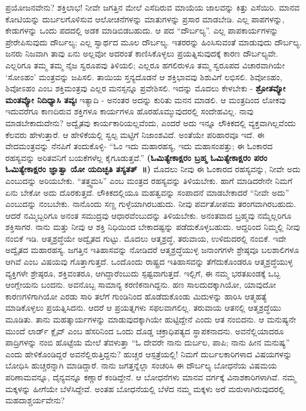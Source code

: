 ಪ್ರಯೋಜನವೇನು? ಶಕ್ತಿಲಾಭ! ನೀವೇ ಜಗತ್ತಿನ ಮೇಲೆ ಎಸೆದಿರುವ ಮಾಯೆಯ ಜಾಲವನ್ನು ಕಿತ್ತು ಎಸೆಯಿರಿ. ಮಾನವ ಕೋಟಿಯನ್ನು ದುರ್ಬಲಗೊಳಿಸುವ ಆಲೋಚನೆಗಳನ್ನು ಮಾತುಗಳನ್ನು ಪ್ರಸಾರ ಮಾಡಬೇಡಿ. ಎಲ್ಲ ಪಾಪಗಳನ್ನು, ಕೇಡುಗಳನ್ನು ಒಂದು ಪದದಲ್ಲಿ ಅಡಕ ಮಾಡಿಬಿಡಬಹುದು. ಆ ಪದ “ದೌರ್ಬಲ್ಯ”. ಎಲ್ಲ ಪಾಪಕಾರ್ಯಗಳನ್ನು ಪ್ರೇರೇಪಿಸುವುದು ದೌರ್ಬಲ್ಯ; ಎಲ್ಲ ಸ್ವಾರ್ಥದ ಮೂಲ ದೌರ್ಬಲ್ಯ. ಇತರರನ್ನು ಹಿಂಸಿಸುವಂತೆ ಮಾಡುವುದು ದೌರ್ಬಲ್ಯ. ಜನರು ನಿಜವಾಗಿ ತಾವು ಏನು ಅಲ್ಲವೋ ಅದರಂತೆ ಕಾಣಿಸಿಕೊಳ್ಳಲು ಪ್ರಯತ್ನಿಸುವುದಕ್ಕೆ ಕಾರಣ ದೌರ್ಬಲ್ಯವೇ. ಎಲ್ಲರಿಗೂ ತಮ್ಮ ತಮ್ಮ ನೈಜ ಸ್ವರೂಪವು ತಿಳಿಯಲಿ; ಎಲ್ಲರೂ ಹಗಲಿರುಳೂ ತಮ್ಮ ಸ್ವರೂಪದ ವಿಚಾರವಾಗಿಯೇ ‘ಸೋಽಹಂ’ ಮಂತ್ರವನ್ನು ಜಪಿಸಲಿ. ತಾಯಿಯ ಸ್ತನ್ಯದೊಡನೆ ಆ ಶಕ್ತಿಭಾವವು ಶಿಶುವಿಗೆ ಲಭಿಸಲಿ. ಶಿವೋಽಹಂ, ಶಿವೋಽಹಂ ಎಂಬ ಶಕ್ತಿಮಂತ್ರವು ಎಲ್ಲರ ಮನಸ್ಸನ್ನೂ ಪ್ರವೇಶಿಸಲಿ. ಇದನ್ನು ಮೊದಲು ಕೇಳಬೇಕು - \textbf{ಶ್ರೋತವ್ಯೋ ಮಂತವ್ಯೋ ನಿದಿಧ್ಯಾಸಿ ತವ್ಯಃ} ಇತ್ಯಾದಿ - ಅನಂತರ ಅದನ್ನು ಕುರಿತು ಮನನ ಮಾಡಲಿ. ಆ ಮಂತ್ರದಿಂದ ಲೋಕವು ಇದುವರೆಗೂ ಕಾಣದಿರುವ ಶಕ್ತಿಗಳೂ ಕಾರ್ಯಗಳೂ ಹೊರಹೊಮ್ಮುವುದರಲ್ಲಿ ಸಂದೇಹವಿಲ್ಲ. ನಾವು ಮಾಡಬೇಕಾದುದೇನು? ಅದ್ವೈತವು ಕಾರ್ಯಕಾರಿಯಲ್ಲವೆಂದು, ಎಂದರೆ ಅದು ಇನ್ನೂ ಲೌಕಿಕದಲ್ಲಿ ವ್ಯಕ್ತವಾಗಿಲ್ಲವೆಂದು ಕೆಲವರು ಹೇಳುತ್ತಾರೆ. ಆ ಹೇಳಿಕೆಯಲ್ಲಿ ಸ್ವಲ್ಪ ಮಟ್ಟಿಗೆ ನಿಜಾಂಶವಿದೆ. ಅಂತೆಯೇ ಪರಿಹಾರವೂ ಇದೆ. ಈ ವೇದಮಂತ್ರವನ್ನು ನೆನಪಿಗೆ ತಂದುಕೊಳ್ಳಿ- “ಓಂ ಇದು ಮಹಾರಹಸ್ಯ, ಇದು ಮಹಾಸಂಪತ್ತು; ಈ ಓಂಕಾರದ ರಹಸ್ಯವನ್ನು ಅರಿತವನಿಗೆ ಬಯಕೆಗಳೆಲ್ಲ ಕೈಗೂಡುತ್ತವೆ.” \textbf{(ಓಮಿತ್ಯೇಕಾಕ್ಷರಂ ಬ್ರಹ್ಮ ಓಮಿತ್ಯೇಕಾಕ್ಷರಂ ಪರಂ ಓಮಿತ್ಯೇಕಾಕ್ಷರಂ ಜ್ಞಾತ್ವಾ ಯೋ ಯದಿಚ್ಛತಿ ತಸ್ಯತತ್​~॥)} ಮೊದಲು ನೀವು ಈ ಓಂಕಾರದ ರಹಸ್ಯವನ್ನು, ನೀವೇ ಅದು ಎಂಬುದನ್ನು ಅರಿಯಬೇಕು. “ತತ್ತ್ವಮಸಿ” ಎಂಬ ಮಂತ್ರದ ರಹಸ್ಯವನ್ನು ತಿಳಿಯಬೇಕು. ಹಾಗೆ ಮಾಡಿದರೇನೇ ನಿಮಗೆ ಏನು ಬೇಕೋ ಅದು ದೊರಕುತ್ತದೆ. ಲೌಕಿಕದಲ್ಲಿಯೂ ಮಹತ್ವವನ್ನು ಸಂಪಾದನೆ ಮಾಡಬೇಕಾದರೆ “ನೀವೇ ಅದು” ಎಂಬುದನ್ನು ನಂಬಬೇಕು. ನಾನೊಂದು ಸಣ್ಣ ಗುಳ್ಳೆಯಾಗಿರಬಹುದು. ನೀವು ಪರ್ವತೋಪಮ ತರಂಗವಾಗಿರಬಹುದು. ಆದರೆ ನಮ್ಮಿಬ್ಬರಿಗೂ ಅನಂತ ಸಮುದ್ರವು ಆಧಾರವೆಂಬುದನ್ನು ತಿಳಿಯಬೇಕು. ಅನಂತವಾದ ಬ್ರಹ್ಮವು ನಮ್ಮೆಲ್ಲರಿಗೂ ಶಕ್ತಿಸಾಗರ. ನಾನು ಮತ್ತು ನೀವು ಆ ಶಕ್ತಿ ನಿಧಿಯಿಂದ ಬೇಕಾದಷ್ಟನ್ನು ಪಡೆದುಕೊಳ್ಳಬಹುದು. ಆದ್ದರಿಂದ ನಿಮ್ಮಲ್ಲಿ ನೀವು ನಂಬಿಕೆ ಇಡಿ. ಆತ್ಮಶ್ರದ್ಧೆಯೇ ಅದ್ವೈತದ ಗುಟ್ಟು. ಮೊದಲು ಆತ್ಮಶ್ರದ್ಧೆ, ತರುವಾಯ, ಉಳಿದುದರಲ್ಲಿ ನಂಬಿಕೆ. ಇದೇ ಅದ್ವೈತದ ಮಹಾರಹಸ್ಯ. ಜಗತ್ತಿನ ಇತಿಹಾಸವನ್ನು ನೋಡಿದರೆ ಆತ್ಮಶ್ರದ್ಧೆಯುಳ್ಳ ಜನಾಂಗಗಳೇ ಶ್ರೇಷ್ಠವೂ ಬಲಶಾಲಿಗಳೂ ಆಗಿವೆ ಎಂಬ ವಿಷಯವು ಗೊತ್ತಾಗುತ್ತದೆ. ಒಂದೊಂದು ರಾಷ್ಟ್ರದ ಇತಿಹಾಸವನ್ನು ತೆಗೆದುಕೊಂಡರೂ ಆತ್ಮಶ್ರದ್ಧೆಯುಳ್ಳ ವ್ಯಕ್ತಿಗಳೇ ಶ್ರೇಷ್ಠರೂ, ಶಕ್ತಿವಂತರೂ, ಆಗಿದ್ದಾರೆಂಬುದು ಸ್ಪಷ್ಟವಾಗುತ್ತದೆ. ಇಲ್ಲಿಗೆ, ಈ ನಮ್ಮ ಭರತಖಂಡಕ್ಕೆ ಒಬ್ಬ ಆಂಗ್ಲೇಯನು ಬಂದನು. ಅವನೊಬ್ಬ ಸಾಮಾನ್ಯ ಕರಣಿಕನಾಗಿದ್ದನು. ಹಣ ಸಾಲದುದಕ್ಕಾಗಿಯೋ, ಯಾವುದೋ ಕಾರಣಗಳಿಗಾಗಿಯೋ ಎರಡು ಸಾರಿ ತಲೆಗೆ ಗುಂಡಿನಿಂದ ಹೊಡೆದುಕೊಂಡು ಮಿದುಳನ್ನು ಹಾರಿಸಿ ಆತ್ಮಹತ್ಯೆ ಮಾಡಿಕೊಳ್ಳಲು ಪ್ರಯತ್ನಿಸಿದನು. ಆದರೆ ಆ ಪ್ರಯತ್ನಗಳು ಸಫಲವಾಗಲಿಲ್ಲ. ತರುವಾಯ ಆತನಲ್ಲಿ ಆತ್ಮಶ್ರದ್ಧೆಯು ಮೂಡಿತು. ತಾನು ಮಹತ್ಕಾರ್ಯಗಳನ್ನು ಮಾಡುವುದಕ್ಕಾಗಿಯೇ ಹುಟ್ಟಿದ್ದೇನೆ ಎಂದು ಆತ ನಂಬಿದನು. ಆ ಮನುಷ್ಯನೇ ಮುಂದೆ ಲಾರ್ಡ್​ ಕ್ಲೈವ್​ ಎಂಬ ಹೆಸರಿನಿಂದ ಒಂದು ದೊಡ್ಡ ಚಕ್ರಾಧಿಪತ್ಯದ ಸ್ಥಾಪಕನಾದನು. ಅವನೆಲ್ಲಿಯಾದರೂ ಪಾದ್ರಿಗಳನ್ನು ನಂಬಿ ಹೊಟ್ಟೆಯ ಮೇಲೆ ತೆವಳುತ್ತಾ “ಓ ದೇವರೇ ನಾನು ದುರ್ಬಲ, ಪಾಪಿ; ನಾನು ಹೀನ ಮನುಷ್ಯ” ಎಂದು ಹೇಳಿಕೊಂಡಿದ್ದರೆ ಅವನೆಲ್ಲಿರುತ್ತಿದ್ದನು? ಹುಚ್ಚರ ಆಸ್ಪತ್ರೆಯಲ್ಲಿ! ನಿಮಗೆ ದುರ್ಬಲಕಾರಿಗಳಾದ ವಿಷಯಗಳನ್ನು ಬೋಧಿಸಿ ಹುಚ್ಚರನ್ನಾಗಿ ಮಾಡಿದ್ದಾರೆ. ನಾನು ಜಗತ್ತನ್ನೆಲ್ಲಾ ಸಂಚರಿಸಿ ಈ ದೌರ್ಬಲ್ಯ ಬೋಧನೆಯ ವಿಷಮಯ ಪರಿಣಾಮವನ್ನೂ, ದೈನ್ಯವನ್ನೂ ಕಣ್ಣಾರೆ ಕಂಡಿದ್ದೇನೆ. ಆ ಬೋಧನೆಗಳು ಮಾನವ ವರ್ಗಕ್ಕೆ ವಿನಾಶಕಾರಿಗಳಾಗಿವೆ. ನಮ್ಮ ಮಕ್ಕಳನ್ನು ಹೀಗೆಯೇ ಬೆಳೆಸಿದ್ದೇವೆ. ಅಂತಹ ಬೋಧನೆಯಲ್ಲಿ ಬೆಳೆದ ನಮ್ಮ ಮಕ್ಕಳು ಅರೆ ಮರುಳಾಗಿರುವುದರಲ್ಲಿ ಮಹದಾಶ್ಚರ್ಯವೇನು?

